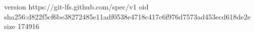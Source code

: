 version https://git-lfs.github.com/spec/v1
oid sha256:d822f5cf6be38272485e11adf0538e4718c417c6f976d7573ad453ecd618de2e
size 174916
